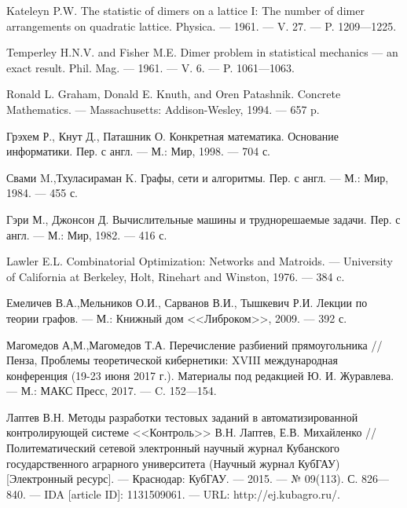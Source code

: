 \begin{thebibliography}{111}
Kateleyn P.W. The statistic of dimers on a lattice I: The number of dimer arrangements on quadratic lattice.
Physica. --- 1961. --- V. 27. --- P. 1209---1225.



Temperley H.N.V. and Fisher M.E.
Dimer problem in statistical mechanics --- an exact result.
 Phil. Mag. --- 1961. --- V. 6. --- P. 1061---1063.
%


Ronald L. Graham, Donald E. Knuth, and Oren Patashnik.
Concrete Mathematics. --- Massachusetts: Addison-Wesley, 1994. --- 657 p.



Грэхем Р., Кнут Д., Паташник О.
Конкретная математика. Основание информатики. Пер. с англ. ---
М.: Мир, 1998. --- 704 с.
%



Свами M.,Тхуласираман K. Графы, сети и алгоритмы. Пер. с англ. --- М.: Мир, 1984. --- 455 с.



Гэри М., Джонсон Д. Вычислительные машины и труднорешаемые задачи. Пер. с англ. --- М.: Мир, 1982. --- 416 с.



Lawler E.L. Combinatorial Optimization: Networks and Matroids. ---
University of California at Berkeley, Holt, Rinehart and Winston,  1976. --- 384 c.



Емеличев В.А.,Мельников О.И., Сарванов В.И., Тышкевич Р.И.
Лекции по теории графов. --- М.: Книжный дом <<Либроком>>, 2009. --- 392 с.



Магомедов А,М.,Магомедов Т.А.
Перечисление разбиений прямоугольника // Пенза, Проблемы теоретической кибернетики: XVIII международная конференция (19-23 июня 2017 г.). Материалы под редакцией Ю. И. Журавлева. --- М.: МАКС Пресс, 2017. --- C. 152---154.











Лаптев В.Н. Методы разработки тестовых заданий в автоматизированной контролирующей системе <<Контроль>> В.Н. Лаптев, Е.В. Михайленко // Политематический сетевой электронный научный журнал Кубанского государственного аграрного университета (Научный журнал КубГАУ) [Электронный ресурс]. --- Краснодар: КубГАУ. --- 2015. --- № 09(113). С. 826---840. --- IDA [article ID]: 1131509061. --- URL: http://ej.kubagro.ru/.




\end{thebibliography}
